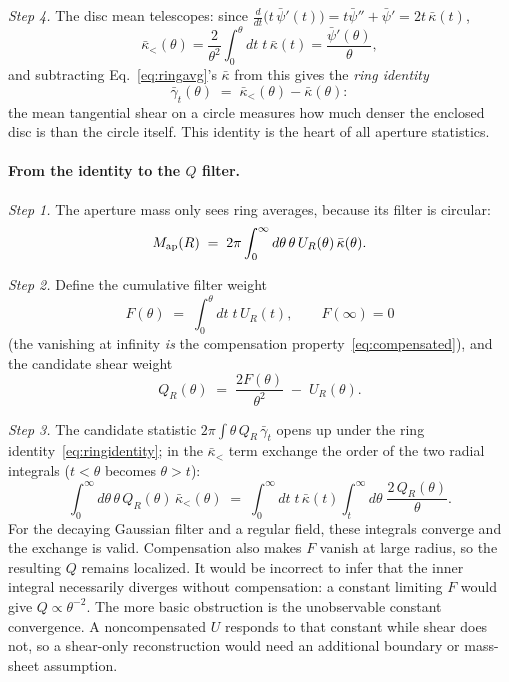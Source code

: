 \documentclass[11pt]{article}
\newcommand{\Map}{M_{\rm ap}}
\newcommand{\Ufil}{U_R}
\newcommand{\Qfil}{Q_R}
\numberwithin{equation}{section}
\begin{document}
\emph{Step 4.}  The disc mean telescopes: since
$\frac{d}{dt}\bigl(t\,\bar\psi'(t)\bigr) = t\bar\psi'' + \bar\psi'
= 2t\,\bar\kappa(t)$,
\begin{equation}
  \bar\kappa_<(\theta)
  = \frac{2}{\theta^2}\int_0^\theta dt\; t\,\bar\kappa(t)
  = \frac{\bar\psi'(\theta)}{\theta} ,
  \label{eq:discmean}
\end{equation}
and subtracting Eq.~\eqref{eq:ringavg}'s $\bar\kappa$ from this
gives the \emph{ring identity}
\begin{equation}
  \bar\gamma_t(\theta)
  \;=\; \bar\kappa_<(\theta) - \bar\kappa(\theta) :
  \label{eq:ringidentity}
\end{equation}
the mean tangential shear on a circle measures how much denser the
enclosed disc is than the circle itself.  This identity is the heart
of all aperture statistics.

\paragraph{From the identity to the $Q$ filter.}
\emph{Step 1.}  The aperture mass only sees ring averages, because
its filter is circular:
\begin{equation}
  \Map(R) \;=\; 2\pi \int_0^\infty d\theta\,\theta\,
  \Ufil(\theta)\, \bar\kappa(\theta) .
  \label{eq:mapring}
\end{equation}

\emph{Step 2.}  Define the cumulative filter weight
\begin{equation}
  F(\theta) \;=\; \int_0^\theta dt\; t\, \Ufil(t),
  \qquad F(\infty) = 0
  \label{eq:cumweight}
\end{equation}
(the vanishing at infinity \emph{is} the compensation
property~\eqref{eq:compensated}), and the candidate shear weight
\begin{equation}
  \Qfil(\theta) \;=\;
  \frac{2 F(\theta)}{\theta^2} \;-\; \Ufil(\theta) .
  \label{eq:qdeffromu}
\end{equation}

\emph{Step 3.}  The candidate statistic
$2\pi\int\theta\,\Qfil\,\bar\gamma_t$ opens up under the ring
identity~\eqref{eq:ringidentity}; in the
$\bar\kappa_<$ term exchange the order of the two radial integrals
($t < \theta$ becomes $\theta > t$):
\begin{equation}
  \int_0^\infty d\theta\,\theta\, \Qfil(\theta)\,
  \bar\kappa_<(\theta)
  \;=\;
  \int_0^\infty dt\; t\, \bar\kappa(t)
  \int_t^\infty d\theta\; \frac{2\,\Qfil(\theta)}{\theta} .
  \label{eq:exchange}
\end{equation}
For the decaying Gaussian filter and a regular field, these integrals
converge and the exchange is valid. Compensation also makes $F$ vanish
at large radius, so the resulting $Q$ remains localized. It would be
incorrect to infer that the inner integral necessarily diverges without
compensation: a constant limiting $F$ would give $Q\propto\theta^{-2}$.
The more basic obstruction is the unobservable constant convergence.
A noncompensated $U$ responds to that constant while shear does not, so
a shear-only reconstruction would need an additional boundary or
mass-sheet assumption.
\end{document}
